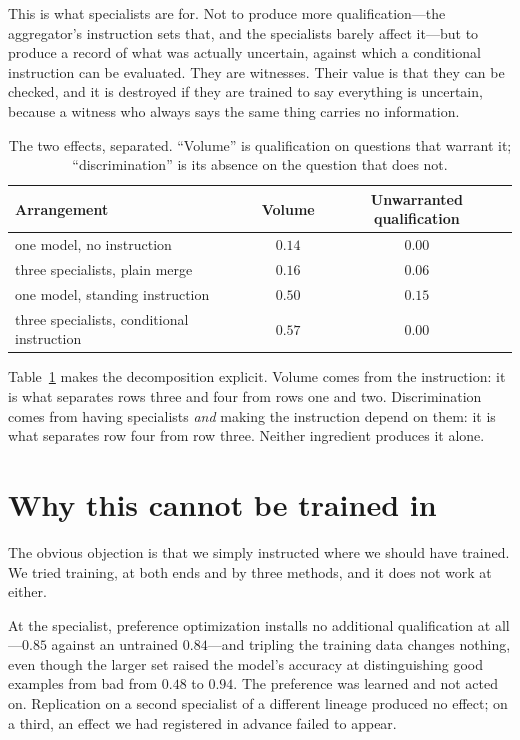 \documentclass[11pt]{article}
\begin{document}
This is what specialists are for. Not to produce more qualification---the
aggregator's instruction sets that, and the specialists barely affect it---but
to produce a record of what was actually uncertain, against which a
conditional instruction can be evaluated. They are witnesses. Their value is
that they can be checked, and it is destroyed if they are trained to say
everything is uncertain, because a witness who always says the same thing
carries no information.

\begin{table}[t]
\centering
\caption{The two effects, separated. ``Volume'' is qualification on questions
that warrant it; ``discrimination'' is its absence on the question that does
not.}
\label{tab:sep}
\begin{tabular}{lcc}
\toprule
Arrangement & Volume & Unwarranted qualification \\
\midrule
one model, no instruction & $0.14$ & $0.00$ \\
three specialists, plain merge & $0.16$ & $0.06$ \\
one model, standing instruction & $0.50$ & $0.15$ \\
three specialists, conditional instruction & $0.57$ & $\mathbf{0.00}$ \\
\bottomrule
\end{tabular}
\end{table}

Table~\ref{tab:sep} makes the decomposition explicit. Volume comes from the
instruction: it is what separates rows three and four from rows one and two.
Discrimination comes from having specialists \emph{and} making the instruction
depend on them: it is what separates row four from row three. Neither
ingredient produces it alone.

\section{Why this cannot be trained in}
The obvious objection is that we simply instructed where we should have
trained. We tried training, at both ends and by three methods, and it does not
work at either.

At the specialist, preference optimization installs no additional
qualification at all---$0.85$ against an untrained $0.84$---and tripling the
training data changes nothing, even though the larger set raised the model's
accuracy at distinguishing good examples from bad from $0.48$ to $0.94$. The
preference was learned and not acted on. Replication on a second specialist of
a different lineage produced no effect; on a third, an effect we had
registered in advance failed to appear.
\end{document}
